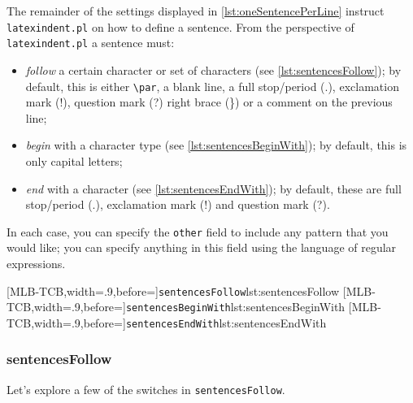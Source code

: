  The remainder of the settings displayed in \vref{lst:oneSentencePerLine} instruct
 \texttt{latexindent.pl} on how to define a sentence. From the perspective of
 \texttt{latexindent.pl} a sentence must:   
 \begin{itemize}
  \item \emph{follow} a certain character or set of characters (see
        \cref{lst:sentencesFollow}); by default, this is either \lstinline!\par!, a
        blank line, a full stop/period (.), exclamation mark (!), question mark (?) right brace
        (\}) or a comment on the previous line;
  \item \emph{begin} with a character type (see \cref{lst:sentencesBeginWith}); by
        default, this is only capital letters;
  \item \emph{end} with a character (see \cref{lst:sentencesEndWith}); by
        default, these are full stop/period (.), exclamation mark (!) and question mark (?).
 \end{itemize}
 In each case, you can specify the \texttt{other} field to include any pattern that you
 would like; you can specify anything in this field using the language of regular
 expressions.  

 \begin{cmhtcbraster}[raster columns=3,
   raster left skip=-3.5cm,
   raster right skip=-2cm,
   raster column skip=.06\linewidth]
  [MLB-TCB,width=.9\linewidth,before=\centering]{\texttt{sentencesFollow}}{lst:sentencesFollow}
  [MLB-TCB,width=.9\linewidth,before=\centering]{\texttt{sentencesBeginWith}}{lst:sentencesBeginWith}
  [MLB-TCB,width=.9\linewidth,before=\centering]{\texttt{sentencesEndWith}}{lst:sentencesEndWith}
 \end{cmhtcbraster}

\subsubsection{sentencesFollow}
 Let's explore a few of the switches in \texttt{sentencesFollow}.

